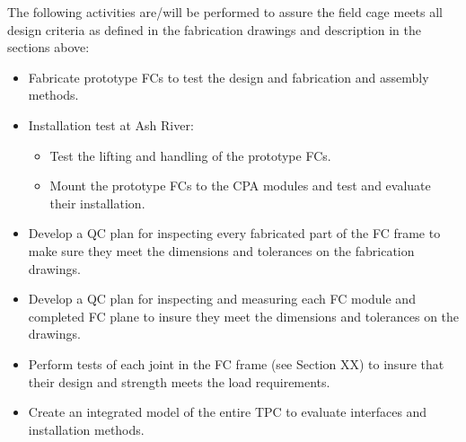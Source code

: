 The following activities are/will be performed to assure the field cage meets all design criteria as defined in the fabrication drawings and description in the sections above:
\begin{itemize}
\item	Fabricate prototype FCs to test the design and fabrication and assembly methods.
\item	Installation test at Ash River:
\begin{itemize}
\item	Test the lifting and handling of the prototype FCs.
\item	Mount the prototype FCs to the CPA modules and test and evaluate their installation.
\end{itemize}
\item	Develop a QC plan for inspecting every fabricated part of the FC frame to make sure they meet the dimensions and tolerances on the fabrication drawings.
\item	Develop a QC plan for inspecting and measuring each FC module and completed FC plane to insure they meet the dimensions and tolerances on the drawings.
\item	Perform tests of each joint in the FC frame (see Section XX) to insure that their design and strength meets the load requirements.
\item	Create an integrated model of the entire TPC to evaluate interfaces and installation methods.  
\end{itemize}

 


